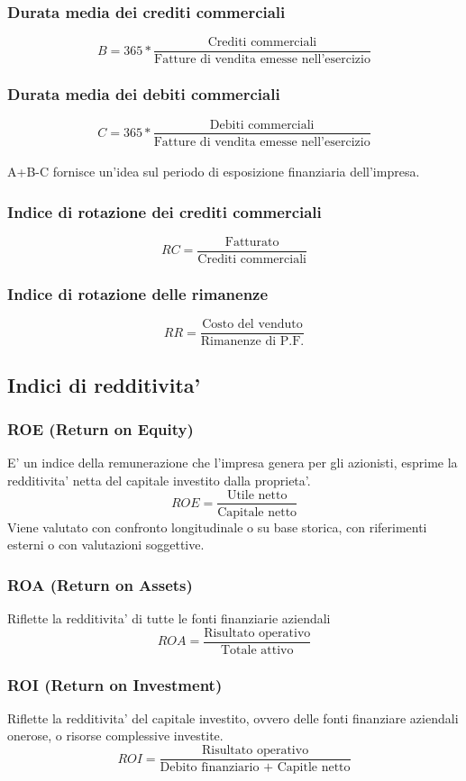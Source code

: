 \documentclass{report}
\begin{document}
	\subsubsection{Durata media dei crediti commerciali}
	\[B = 365 * \frac{\text{Crediti commerciali}}{\text{Fatture di vendita emesse nell'esercizio}}\]
	\subsubsection{Durata media dei debiti commerciali}
	\[C = 365 * \frac{\text{Debiti commerciali}}{\text{Fatture di vendita emesse nell'esercizio}}\]
	\medskip \\
	A+B-C fornisce un'idea sul periodo di esposizione finanziaria dell'impresa.
	\subsubsection{Indice di rotazione dei crediti commerciali}
	\[RC = \frac{\text{Fatturato}}{\text{Crediti commerciali}}\]
	\subsubsection{Indice di rotazione delle rimanenze}
	\[RR = \frac{\text{Costo del venduto}}{\text{Rimanenze di P.F.}}\]
	\subsection{Indici di redditivita'}
	\subsubsection{ROE (Return on Equity)}
	E' un indice della remunerazione che l'impresa genera per gli azionisti, esprime la redditivita' netta del capitale investito dalla proprieta'.
	\[ROE = \frac{\text{Utile netto}}{\text{Capitale netto}}\]
	Viene valutato con confronto longitudinale o su base storica, con riferimenti esterni o con valutazioni soggettive.
	\subsubsection{ROA (Return on Assets)}
	Riflette la redditivita' di tutte le fonti finanziarie aziendali
	\[ROA = \frac{\text{Risultato operativo}}{\text{Totale attivo}}\]
	\subsubsection{ROI (Return on Investment)}
	Riflette la redditivita' del capitale investito, ovvero delle fonti finanziare aziendali onerose, o risorse complessive investite.
	\[ROI = \frac{\text{Risultato operativo}}{\text{Debito finanziario + Capitle netto}}\]
\end{document}
